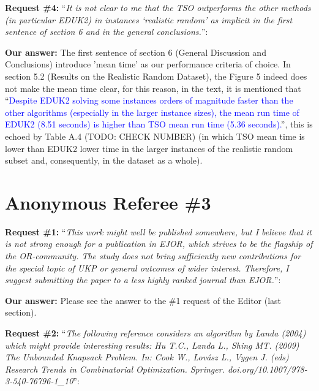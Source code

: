 \documentclass{elsarticle}
\begin{document}
\textbf{Request \#4:} ``\textit{It is not clear to me that the TSO outperforms the other methods (in particular EDUK2) in instances `realistic random' as implicit in the first sentence of section 6 and in the general conclusions.}'': 

\textbf{Our answer:} The first sentence of section 6 (General Discussion and Conclusions) introduce 'mean time' as our performance criteria of choice. In section 5.2 (Results on the Realistic Random Dataset), the Figure 5 indeed does not make the mean time clear, for this reason, in the text, it is mentioned that ``\textcolor{blue}{Despite EDUK2 solving some instances orders of magnitude faster than the other algorithms (especially in the larger instance sizes), the mean run time of EDUK2 (8.51 seconds) is higher than TSO mean run time (5.36 seconds).}'', this is echoed by Table A.4 (TODO: CHECK NUMBER) (in which TSO mean time is lower than EDUK2 lower time in the larger instances of the realistic random subset and, consequently, in the dataset as a whole). 
\medskip

\section{Anonymous Referee \#3}

\textbf{Request \#1:} ``\textit{This work might well be published somewhere, but I believe that it is not strong enough for a publication in EJOR, which strives to be the flagship of the OR-community. The study does not bring sufficiently new contributions for the special topic of UKP or general outcomes of wider interest. Therefore, I suggest submitting the paper to a less highly ranked journal than EJOR.}'': 

\textbf{Our answer:} Please see the answer to the \#1 request of the Editor (last section).
\medskip

\textbf{Request \#2:} ``\textit{The following reference considers an algorithm by Landa (2004) which might provide interesting results: Hu T.C., Landa L., Shing MT. (2009) The Unbounded Knapsack Problem. In: Cook W., Lovász L., Vygen J. (eds) Research Trends in Combinatorial Optimization. Springer. doi.org/10.1007/978-3-540-76796-1\_10}'': 
\end{document}
